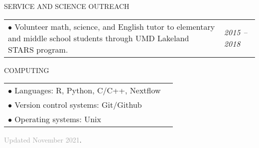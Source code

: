 \documentclass{resume} %
\begin{document}
\begin{rSection}{SERVICE AND SCIENCE OUTREACH}
	\begin{tabular}{p{14cm}R{2.5cm}}
		$\bullet$ Volunteer math, science, and English tutor to elementary and middle school students through UMD Lakeland STARS program. & \it{2015 -- 2018}  \\ 
	\end{tabular} 
\end{rSection}

\begin{rSection}{COMPUTING}
	
	\begin{tabular}{p{14cm}R{2.5cm}}
		$\bullet$ Languages:  R, Python, C/C++, Nextflow  &   \\ 
		$\bullet$ Version control systems: Git/Github  &   \\ 
		$\bullet$ Operating systems: Unix
	\end{tabular} 
	
\end{rSection}

\textcolor{darkgray}{Updated November 2021}.
\end{document}
